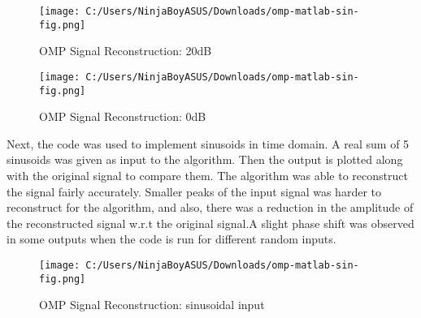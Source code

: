 \documentclass[
  letterpaper,
  DIV=11,
  numbers=noendperiod]{scrartcl}
\begin{document}
\begin{figure}[H]

{\centering \texttt{[image: C:/Users/NinjaBoyASUS/Downloads/omp-matlab-sin-fig.png]}

}

\caption{OMP Signal Reconstruction: 20dB}

\end{figure}%

\begin{figure}[H]

{\centering \texttt{[image: C:/Users/NinjaBoyASUS/Downloads/omp-matlab-sin-fig.png]}

}

\caption{OMP Signal Reconstruction: 0dB}

\end{figure}%

Next, the code was used to implement sinusoids in time domain. A real
sum of 5 sinusoids was given as input to the algorithm. Then the output
is plotted along with the original signal to compare them. The algorithm
was able to reconstruct the signal fairly accurately. Smaller peaks of
the input signal was harder to reconstruct for the algorithm, and also,
there was a reduction in the amplitude of the reconstructed signal w.r.t
the original signal.A slight phase shift was observed in some outputs
when the code is run for different random inputs.

\begin{figure}[H]

{\centering \texttt{[image: C:/Users/NinjaBoyASUS/Downloads/omp-matlab-sin-fig.png]}

}

\caption{OMP Signal Reconstruction: sinusoidal input}

\end{figure}%
\end{document}
